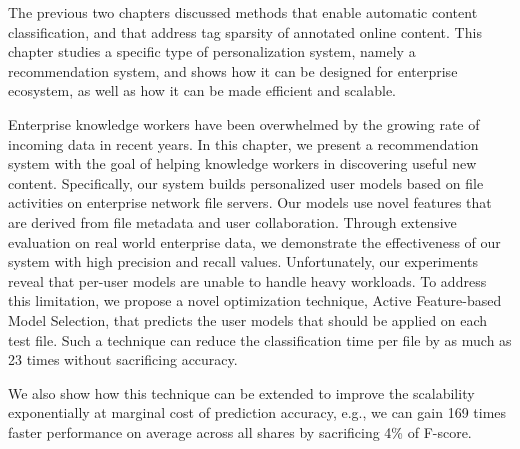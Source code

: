 The previous two chapters discussed methods that enable automatic content classification, and that address tag sparsity of annotated online content. This chapter studies a specific type of personalization system, namely a recommendation system, and shows how it can be designed for enterprise ecosystem, as well as how it can be made efficient and scalable. 


  Enterprise knowledge workers have been overwhelmed by the growing
  rate of incoming data in recent years.  In this chapter, we present a
  recommendation system with the goal of helping knowledge workers in
  discovering useful new content.  Specifically, our system builds
  personalized user models based on file activities on enterprise
  network file servers.  Our models use novel features that are
  derived from file metadata and user collaboration.  Through
  extensive evaluation on real world enterprise data, we demonstrate
  the effectiveness of our system with high precision and recall
  values.  Unfortunately, our experiments reveal that per-user models
  are unable to handle heavy workloads.  To address this
  limitation, we propose a novel optimization technique, Active
  Feature-based Model Selection, that predicts the user models that 
should be applied on each test file. Such a technique can reduce the 
classification time per file by as much as 23 times without sacrificing accuracy. 

  We also show how this technique can be extended to improve the
  scalability exponentially at marginal cost of prediction accuracy, e.g., we can 
 gain 169 times faster performance on average across all shares by sacrificing 4\%
  of F-score.



 

 
% 



